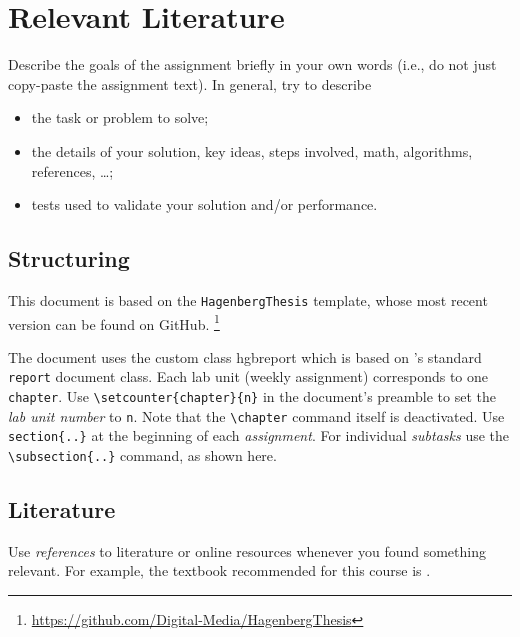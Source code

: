 \documentclass[english,notitlepage,smartquotes]{hgbreport}
\renewcommand{\chapter}[1]{} %
\begin{document}
\section{Relevant Literature}

Describe the goals of the assignment briefly in your own words
(i.e., do not just copy-paste the assignment text).
In general, try to describe
%
\begin{itemize}
	\item the task or problem to solve;
	\item the details of your solution, key ideas, steps involved, math,
	algorithms, references, \ldots;
	\item tests used to validate your solution and/or performance.
\end{itemize}

\subsection{Structuring} %

This \latex document is based on the \texttt{HagenbergThesis} 
template, whose most recent version can be found on GitHub.%
\footnote{\url{https://github.com/Digital-Media/HagenbergThesis}}

The document uses the custom class \textsf{hgbreport} which is based
on \latex's standard \texttt{report} document class. Each lab unit 
(weekly assignment) corresponds to one \texttt{chapter}.
Use \verb!\setcounter{chapter}{n}! in the document's preamble
to set the \emph{lab unit number} to \texttt{n}.
Note that the \verb!\chapter! command itself is deactivated.
Use \verb!section{..}! at the beginning of each \emph{assignment}.
For individual \emph{subtasks} use the 
\verb!\subsection{..}! command, as shown here.

\subsection{Literature}

Use \emph{references} to literature or online resources whenever you found 
something relevant. For example, the textbook recommended for this course is
\cite{Sedgewick2011}.
\end{document}
